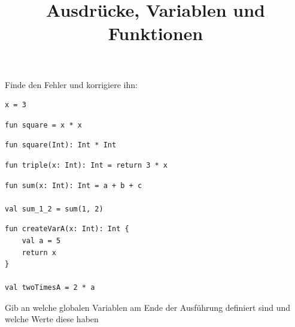 \documentclass[DIV = 11]{scrartcl}
\title{Ausdrücke, Variablen und Funktionen}
\begin{document}
\begin{aufgabe}
Finde den Fehler und korrigiere ihn:

\begin{teilaufgaben}
\teilaufgabe \begin{verbatim}
x = 3
\end{verbatim}

\teilaufgabe \begin{verbatim}
fun square = x * x
\end{verbatim}

\teilaufgabe \begin{verbatim}
fun square(Int): Int * Int
\end{verbatim}

\teilaufgabe \begin{verbatim}
fun triple(x: Int): Int = return 3 * x
\end{verbatim}

\teilaufgabe \begin{verbatim}
fun sum(x: Int): Int = a + b + c

val sum_1_2 = sum(1, 2)
\end{verbatim}
\teilaufgabe 

\begin{verbatim}
fun createVarA(x: Int): Int {
    val a = 5
    return x
}

val twoTimesA = 2 * a
\end{verbatim}
\end{teilaufgaben}

\end{aufgabe}
\begin{aufgabe}
Gib an welche globalen Variablen am Ende der Ausführung definiert sind und welche Werte diese haben
\end{aufgabe}
\end{document}
